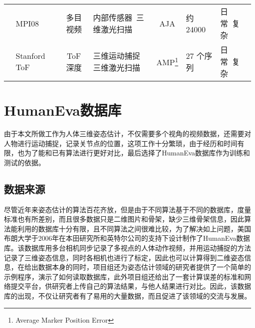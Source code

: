 \begin{table}[htbp]
\begin{minipage}[t]{\linewidth}
\begin{tabular}{c|p{7em}<{\centering}cp{6em}<{\centering}cp{5em}<{\centering}p{3em}<{\centering}}
      & MPI08~\cite{pons2010multisensor} & 多目视频 & 内部传感器\ 三维激光扫描 & AJA & 约24000 & 日常\ 复杂\\
      & Stanford ToF~\cite{ganapathi2010real} & ToF 深度 & 三维运动捕捉 三维激光扫描 & AMP\footnote{Average Marker Position Error} & 27 个序列 & 日常\ 复杂\\
      \bottomrule[1.5pt]
    \end{tabular}
    \end{minipage}
\end{table}

\section{HumanEva数据库}
\label{sec:HumanEva}
由于本文所做工作为人体三维姿态估计，不仅需要多个视角的视频数据，还需要对人物进行运动捕捉，记录关节点的位置，这项工作十分繁琐，由于经历和时间有限，也为了能和已有算法进行更好对比，最后选择了HumanEva数据库作为训练和测试的依据。
\subsection{数据来源}
尽管近年来姿态估计的算法百花齐放，但是由于不同算法基于不同的数据库，度量标准也有所差别，而且很多数据只是二维图片和骨架，缺少三维骨架信息，因此算法能利用的数据库十分有限，且不同算法之间很难比较，为了解决如上问题，美国布朗大学于2006年在本田研究所和英特尔公司的支持下设计制作了HumanEva数据库。该数据库用多台相机同步记录了多视点的人体动作视频，并用运动捕捉的方法记录了三维姿态信息，同时各相机也进行了标定，因此也可以计算得到二维姿态信息，在给出数据本身的同时，项目组还为姿态估计领域的研究者提供了一个简单的示例程序，演示了如何读取数据库，此外项目组还给出了一套计算误差的标准和网络提交平台，供研究者上传自己的算法结果，与他人结果进行对比。因此，该数据库的出现，不仅让研究者有了易用的大量数据，而且促进了该领域的交流与发展。

